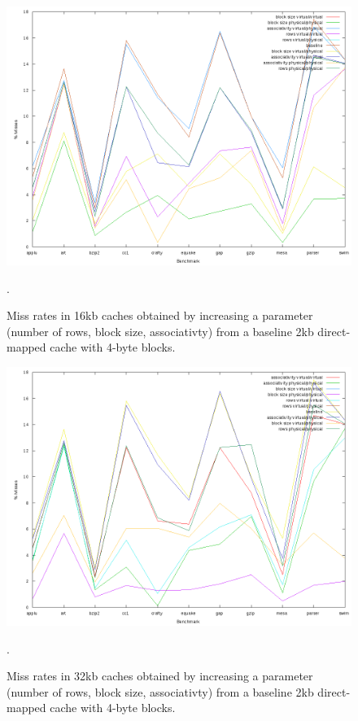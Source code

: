\begin{figure}[htb]
  \includegraphics[width=6.8in]{6.823/lab2/figs/ccc_16k.png}
  \caption{Miss rates in 16kb caches obtained by increasing a parameter
  (number of rows, block size, associativty) from a baseline 2kb direct-mapped
  cache with 4-byte blocks.} \label{q1:16k}.
\end{figure}

\begin{figure}[htb]
  \includegraphics[width=6.8in]{6.823/lab2/figs/ccc_32k.png}
  \caption{Miss rates in 32kb caches obtained by increasing a parameter
  (number of rows, block size, associativty) from a baseline 2kb direct-mapped
  cache with 4-byte blocks.} \label{q1:32k}.
\end{figure}

